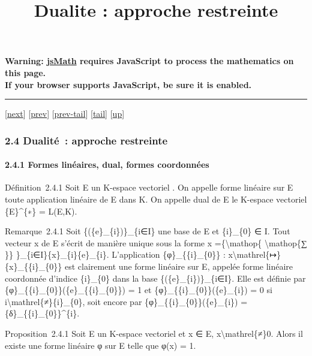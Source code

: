\documentclass[]{article}
\title{Dualite : approche restreinte}
\author{}
\date{}
\begin{document}
\maketitle

\textbf{Warning: \href{http://www.math.union.edu/locate/jsMath}{jsMath}
requires JavaScript to process the mathematics on this page.\\ If your
browser supports JavaScript, be sure it is enabled.}

\begin{center}\rule{3in}{0.4pt}\end{center}

{[}\href{coursse11.html}{next}{]} {[}\href{coursse9.html}{prev}{]}
{[}\href{coursse9.html\#tailcoursse9.html}{prev-tail}{]}
{[}\hyperref[tailcoursse10.html]{tail}{]}
{[}\href{coursch3.html\#coursse10.html}{up}{]}

\subsubsection{2.4 Dualité~: approche restreinte}

\paragraph{2.4.1 Formes linéaires, dual, formes coordonnées}

Définition~2.4.1 Soit E un K-espace vectoriel . On appelle forme
linéaire sur E toute application linéaire de E dans K. On appelle dual
de E le K-espace vectoriel \{E\}\^{}\{∗\} = L(E,K).

Remarque~2.4.1 Soit \{(\{e\}\_\{i\})\}\_\{i∈I\} une base de E et
\{i\}\_\{0\} ∈ I. Tout vecteur x de E s'écrit de manière unique sous la
forme x =\{\textbackslash{}mathop\{ \textbackslash{}mathop\{∑ \}\}
\}\_\{i∈I\}\{x\}\_\{i\}\{e\}\_\{i\}. L'application
\{φ\}\_\{\{i\}\_\{0\}\} :
x\textbackslash{}mathrel\{↦\}\{x\}\_\{\{i\}\_\{0\}\} est clairement une
forme linéaire sur E, appelée forme linéaire coordonnée d'indice
\{i\}\_\{0\} dans la base \{(\{e\}\_\{i\})\}\_\{i∈I\}. Elle est définie
par \{φ\}\_\{\{i\}\_\{0\}\}(\{e\}\_\{\{i\}\_\{0\}\}) = 1 et
\{φ\}\_\{\{i\}\_\{0\}\}(\{e\}\_\{i\}) = 0 si
i\textbackslash{}mathrel\{≠\}\{i\}\_\{0\}, soit encore par
\{φ\}\_\{\{i\}\_\{0\}\}(\{e\}\_\{i\}) =
\{δ\}\_\{\{i\}\_\{0\}\}\^{}\{i\}.

Proposition~2.4.1 Soit E un K-espace vectoriel et x ∈ E,
x\textbackslash{}mathrel\{≠\}0. Alors il existe une forme linéaire φ sur
E telle que φ(x) = 1.
\end{document}
